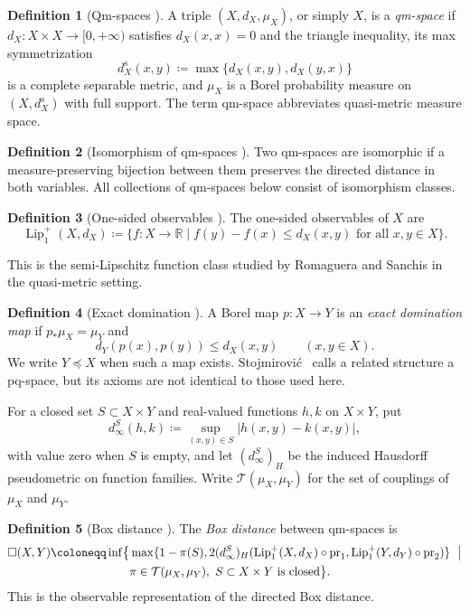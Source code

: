 \documentclass{amsart}
\numberwithin{equation}{section}
\theoremstyle{plain}
\theoremstyle{definition}
\newtheorem*{definition*}{Definition}
\theoremstyle{remark}
\newcommand{\R}{\mathbb R}
\newcommand{\Lipplus}{\operatorname{Lip}^{+}_{1}}
\begin{document}
\begin{definition*}[Qm-spaces {\cite[Definition~2.2]{gds3-ja}}]
A triple $(X,d_X,\mu_X)$, or simply $X$, is a \emph{qm-space} if $d_X\colon X\times X\to[0,+\infty)$ satisfies $d_X(x,x)=0$ and the triangle inequality, its max symmetrization
\[ d_X^{\mathrm s}(x,y)\coloneqq\max\{d_X(x,y),d_X(y,x)\} \]
is a complete separable metric, and $\mu_X$ is a Borel probability measure on $(X,d_X^{\mathrm s})$ with full support.  The term qm-space abbreviates quasi-metric measure space.
\end{definition*}

\begin{definition*}[Isomorphism of qm-spaces {\cite[Definition~2.3]{gds3-ja}}]
Two qm-spaces are isomorphic if a measure-preserving bijection between them preserves the directed distance in both variables.  All collections of qm-spaces below consist of isomorphism classes.
\end{definition*}

\begin{definition*}[One-sided observables {\cite[Definition~2.5]{gds3-ja}}]
The one-sided observables of $X$ are
\[ \Lipplus(X,d_X)\coloneqq\{f\colon X\to\R\mid f(y)-f(x)\le d_X(x,y)\text{ for all }x,y\in X\}. \]
\end{definition*}
This is the semi-Lipschitz function class studied by Romaguera and Sanchis \cite{romaguera2000semi} in the quasi-metric setting.

\begin{definition*}[Exact domination {\cite[Definition in \S2.1]{gds3-ja}}]
A Borel map $p\colon X\to Y$ is an \emph{exact domination map} if $p_*\mu_X=\mu_Y$ and
\[ d_Y(p(x),p(y))\le d_X(x,y)\qquad(x,y\in X). \]
We write $Y\preceq X$ when such a map exists.  Stojmirovi\'c~\cite{stojmirovic2004quasi} calls a related structure a pq-space, but its axioms are not identical to those used here.
\end{definition*}

For a closed set $S\subset X\times Y$ and real-valued functions $h,k$ on $X\times Y$, put
\[ d_\infty^S(h,k)\coloneqq\sup_{(x,y)\in S}|h(x,y)-k(x,y)|, \]
with value zero when $S$ is empty, and let $(d_\infty^S)_H$ be the induced Hausdorff pseudometric on function families.  Write $\mathcal T(\mu_X,\mu_Y)$ for the set of couplings of $\mu_X$ and $\mu_Y$.

\begin{definition*}[Box distance {\cite[Definitions~2.7 and~2.11]{gds3-ja}}]
The \emph{Box distance} between qm-spaces is
\begin{equation}\label{eq:qm-box-distance}
\begin{aligned}
\Box(X,Y)\coloneqq\inf\bigl\{&\max\{1-\pi(S),2(d_\infty^S)_H(\Lipplus(X,d_X)\circ\operatorname{pr}_1,\Lipplus(Y,d_Y)\circ\operatorname{pr}_2)\}\ \bigm|\\
&\pi\in\mathcal T(\mu_X,\mu_Y),\ S\subset X\times Y\text{ is closed}\bigr\}.
\end{aligned}
\end{equation}
This is the observable representation of the directed Box distance.
\end{definition*}
\end{document}
